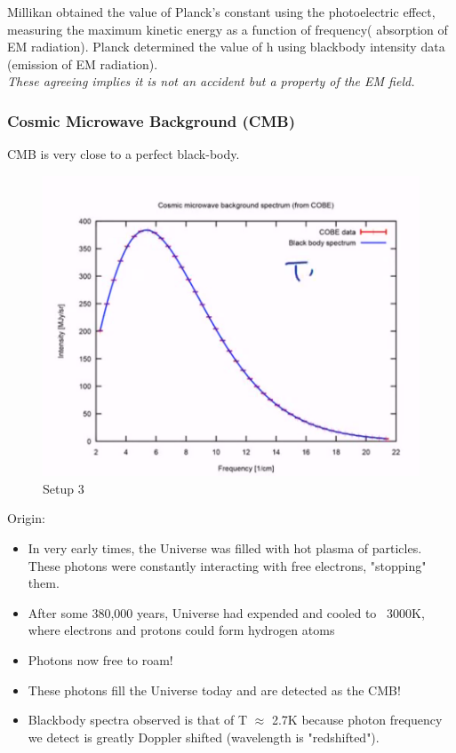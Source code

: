 \documentclass[class=article,crop=false]{standalone}
\begin{document}
Millikan obtained the value of Planck's constant using the photoelectric effect, measuring the maximum kinetic energy as a function of frequency( absorption of EM radiation). Planck determined the value of h using blackbody intensity data (emission of EM radiation).\\
\emph{These agreeing implies it is not an accident but a property of the EM field.} \\

\subsubsection{Cosmic Microwave Background (CMB)}
CMB is very close to a perfect black-body. 

\begin{figure}[h!]
	\centering
	\includegraphics[width=.7\linewidth]{./Images/cmb.png}
	\caption{Setup 3}
\end{figure}
\newpage
Origin: 
\begin{itemize}
	\item In very early times, the Universe was filled with hot plasma of particles. These photons were constantly interacting with free electrons, "stopping" them.
	\item After some 380,000 years, Universe had expended and cooled to ~3000K, where electrons and protons could form hydrogen atoms
	\item Photons now free to roam!
	\item These photons fill the Universe today and are detected as the CMB!
	\item Blackbody spectra observed is that of T $\approx$ 2.7K because photon frequency we detect is greatly Doppler shifted (wavelength is "redshifted").
\end{itemize}
\end{document}
